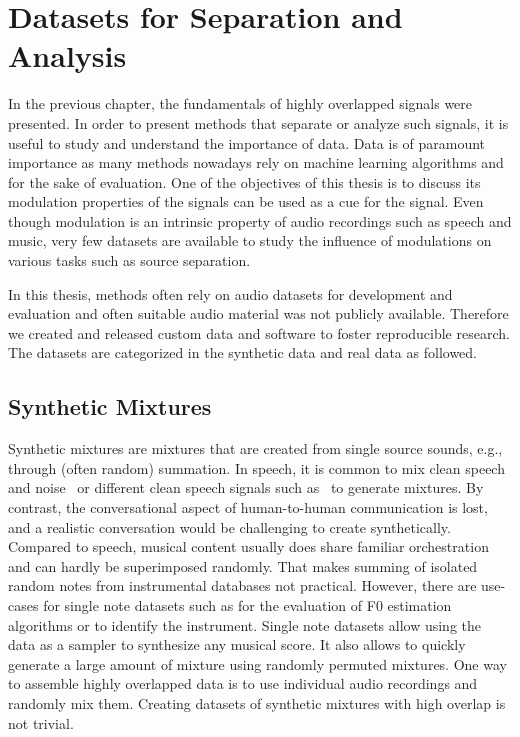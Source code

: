 \chapter{Datasets for Separation and Analysis}
\label{cha:datasets}
In the previous chapter, the fundamentals of highly overlapped signals were presented.
In order to present methods that separate or analyze such signals, it is useful to study and understand the importance of data.
Data is of paramount importance as many methods nowadays rely on machine learning algorithms and for the sake of evaluation.
One of the objectives of this thesis is to discuss its modulation properties of the signals can be used as a cue for the signal.
Even though modulation is an intrinsic property of audio recordings such as speech and music, very few datasets are available to study the influence of modulations on various tasks such as source separation.
\par
In this thesis, methods often rely on audio datasets for development and evaluation and often suitable audio material was not publicly available. Therefore we created and released custom data and software to foster reproducible research.
The datasets are categorized in the synthetic data and real data as followed.

\section{Synthetic Mixtures}

Synthetic mixtures are mixtures that are created from single source sounds, e.g., through (often random) summation. 
In speech, it is common to mix clean speech and noise~\cite{varga93} or different clean speech signals such as~\cite{garofolo93} to generate mixtures.
By contrast, the conversational aspect of human-to-human communication is lost, and a realistic  conversation would be challenging to create synthetically.
Compared to speech, musical content usually does share familiar orchestration and can hardly be superimposed randomly. 
That makes summing of isolated random notes from instrumental databases not practical.
However, there are use-cases for single note datasets such as for the evaluation of F0 estimation algorithms or to identify the instrument.
Single note datasets allow using the data as a sampler to synthesize any musical score.
It also allows to quickly generate a large amount of mixture using randomly permuted mixtures.
One way to assemble highly overlapped data is to use individual audio recordings and randomly mix them.
Creating datasets of synthetic mixtures with high overlap is not trivial.

